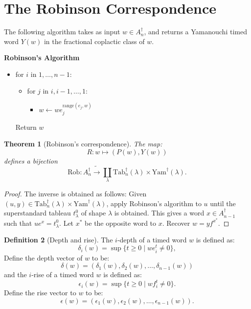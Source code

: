 \documentclass[12pt]{amsproc}
\newcommand{\Yam}{\mathrm{Yam}}
\newcommand{\Rob}{\mathrm{Rob}}
\newcommand{\range}{\mathrm{range}}
\newcommand{\ot}{\leftarrow}
\newcommand{\Tab}{\mathrm{Tab}}
\newtheorem{theorem}{Theorem}
\theoremstyle{definition}
\newtheorem{definition}[theorem]{Definition}
\begin{document}
\section{The Robinson Correspondence}
\label{sec:rob}
The following algorithm takes as input $w\in A_n^\dagger$, and returns a Yamanouchi timed word $Y(w)$ in the fractional coplactic class of $w$.
\begin{center}
  \textbf{Robinson's Algorithm}
\end{center}
\begin{itemize}
\item for $i$ in $1,\dotsc,n-1$:
  \begin{itemize}
  \item for $j$ in $i, i-1,\dotsc,1$:
    \begin{itemize}
    \item $w\ot w e_j^{\range(e_j,w)}$
    \end{itemize}
  \end{itemize}
  Return $w$
\end{itemize}
\begin{theorem}
  [Robinson's correspondence]
  The map:
  \begin{displaymath}
    R:w\mapsto (P(w),Y(w)) 
  \end{displaymath}
  defines a bijection
  \begin{displaymath}
    \Rob: A_n^\dagger \tilde\to \coprod_\lambda \Tab^\dagger_n(\lambda)\times \Yam^\dagger(\lambda).
  \end{displaymath}
\end{theorem}
\begin{proof}
  The inverse is obtained as follows:
  Given $(u,y)\in \Tab_n^\dagger(\lambda)\times \Yam^\dagger(\lambda)$, apply Robinson's algorithm to $u$ until the superstandard tableau $t_\lambda^0$ of shape $\lambda$ is obtained.
  This gives a word $x\in A_{n-1}^\dagger$ such that $ue^x=t_\lambda^0$.
  Let $x^*$ be the opposite word to $x$.
  Recover $w=yf^{x^*}$.
\end{proof}
\begin{definition}
  [Depth and rise]
  The $i$-depth of a timed word $w$ is defined as:
  \begin{displaymath}
    \delta_i(w)=\sup\{t\geq 0\mid we_i^t\neq 0\},
  \end{displaymath}
  Define the depth vector of $w$ to be:
  \begin{displaymath}
    \delta(w) = (\delta_1(w),\delta_2(w),\dotsc,\delta_{n-1}(w))
  \end{displaymath}
  and the $i$-rise of a timed word $w$ is defined as:
  \begin{displaymath}
    \epsilon_i(w) = \sup\{t\geq 0\mid wf_i^t\neq 0\}.
  \end{displaymath}
  Define the rise vector to $w$ to be:
  \begin{displaymath}
    \epsilon(w) = (\epsilon_1(w),\epsilon_2(w),\dotsc,\epsilon_{n-1}(w)).
  \end{displaymath}
\end{definition}
\end{document}
